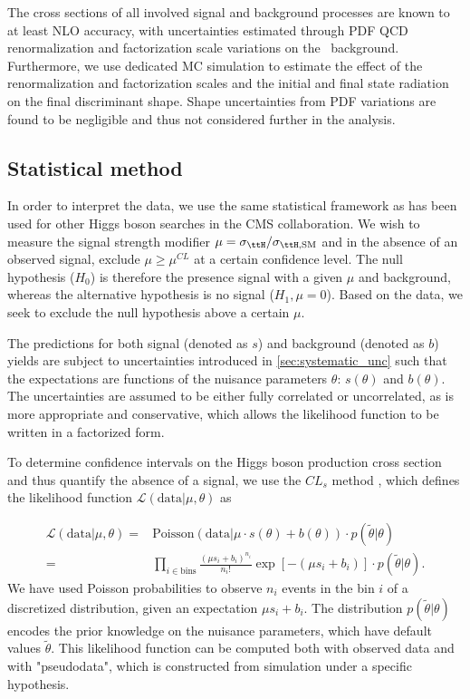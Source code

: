 The cross sections of all involved signal and background processes are known to at least NLO accuracy, with uncertainties estimated through PDF QCD renormalization and factorization scale variations on the \ttbar~background. Furthermore, we use dedicated MC simulation to estimate the effect of the renormalization and factorization scales and the initial and final state radiation on the final discriminant shape. Shape uncertainties from PDF variations are found to be negligible and thus not considered further in the analysis.

\subsection{Statistical method}
\label{sec:statistical_method}
In order to interpret the data, we use the same statistical framework as has been used for other Higgs boson searches in the CMS collaboration\cite{Chatrchyan:2012xdj,Chatrchyan:2012tx,ATLAS:2011tau}. We wish to measure the signal strength modifier $\mu = \sigma_{\ttH}/\sigma_{\ttH,\mathrm{SM}}$ and in the absence of an observed signal, exclude $\mu \ge \mu^{CL}$ at a certain confidence level. The null hypothesis ($H_0$) is therefore the presence signal with a given $\mu$ and background, whereas the alternative hypothesis is no signal ($H_1, \mu = 0 $). Based on the data, we seek to exclude the null hypothesis above a certain $\mu$.

The predictions for both signal (denoted as $s$) and background (denoted as $b$) yields are subject to uncertainties introduced in \cref{sec:systematic_unc} such that the expectations are functions of the nuisance parameters $\theta$: $s(\theta)$ and $b(\theta)$. The uncertainties are assumed to be either fully correlated or uncorrelated, as is more appropriate and conservative, which allows the likelihood function to be written in a factorized form.

To determine confidence intervals on the Higgs boson production cross section and thus quantify the absence of a signal, we use the $CL_s$ method \cite{Junk:1999kv,Read:2002}, which defines the likelihood function $\mathcal{L}(\mathrm{data} | \mu, \theta)$ as

\begin{align}
\label{eq:likelihood}
\mathcal{L}(\mathrm{data} | \mu, \theta) =&  \mathrm{Poisson}(\mathrm{data} | \mu \cdot s(\theta) + b(\theta)) \cdot p(\tilde{\theta} | \theta)\\
=& \prod_{i\in \mathrm{bins}} \frac{(\mu s_i + b_i)^{n_i}}{n_i!} \exp{[-(\mu s_i + b_i)]} \cdot p(\tilde{\theta} | \theta).
\end{align}
We have used Poisson probabilities to observe $n_i$ events in the bin $i$ of a discretized distribution, given an expectation $\mu s_i + b_i$. The distribution $p(\tilde{\theta} | \theta)$ encodes the prior knowledge on the nuisance parameters, which have default values $\tilde{\theta}$. This likelihood function can be computed both with observed data and with "pseudodata", which is constructed from simulation under a specific hypothesis.

